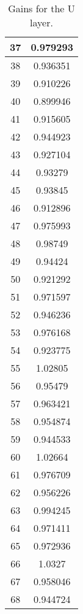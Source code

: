 \begin{table}[h]
\begin{subtable}[h]{2in}
{\begin{tabular}{|c|c|}
37	&	0.979293	\\	\hline
38	&	0.936351	\\	\hline
39	&	0.910226	\\	\hline
40	&	0.899946	\\	\hline
41	&	0.915605	\\	\hline
42	&	0.944923	\\	\hline
43	&	0.927104	\\	\hline
44	&	0.93279	\\	\hline
45	&	0.93845	\\	\hline
46	&	0.912896	\\	\hline
47	&	0.975993	\\	\hline
48	&	0.98749	\\	\hline
49	&	0.94424	\\	\hline
50	&	0.921292	\\	\hline
51	&	0.971597	\\	\hline
52	&	0.946236	\\	\hline
53	&	0.976168	\\	\hline
54	&	0.923775	\\	\hline
55	&	1.02805	\\	\hline
56	&	0.95479	\\	\hline
57	&	0.963421	\\	\hline
58	&	0.954874	\\	\hline
59	&	0.944533	\\	\hline
60	&	1.02664	\\	\hline
61	&	0.976709	\\	\hline
62	&	0.956226	\\	\hline
63	&	0.994245	\\	\hline
64	&	0.971411	\\	\hline
65	&	0.972936	\\	\hline
66	&	1.0327	\\	\hline
67	&	0.958046	\\	\hline
68	&	0.944724	\\	\hline
        \end{tabular}
        }
        \caption{Gains for the U layer.}
    \end{subtable}
    \quad
    \begin{subtable}[h]{2in}
        \centering{}
\end{subtable}
\end{table}
